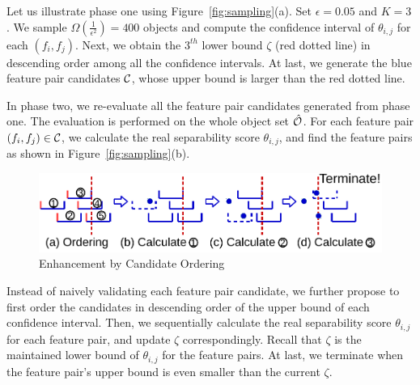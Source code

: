 \begin{example}
Let us illustrate phase one using Figure~\ref{fig:sampling}(a). Set $\epsilon = 0.05$ and $K=3$. We sample $\Omega(\frac{1}{\epsilon^2})=400$ objects and compute the confidence interval of $\theta_{i,j}$ for each $(f_i,f_j)$. Next, we obtain the $3^{th}$ lower bound $\zeta$ (red dotted line) in descending order among all the confidence intervals. At last, we generate the blue feature pair candidates $\cc$, whose upper bound is larger than the red dotted line.
\end{example}

In phase two, we re-evaluate all the feature pair candidates generated from phase one. The evaluation is performed on the whole object set $\hat{\oo}$. For each feature pair $(f_i,f_j)\in \cc$, we calculate the real separability score $\theta_{i,j}$, and find the \topk feature pairs as shown in Figure~\ref{fig:sampling}(b). 
\begin{figure}[h]
  \centering
  \vspace{-5mm}
  \includegraphics[width=\linewidth]{fig/candidate_ordering.pdf}
  \vspace{-6mm}
\caption{Enhancement by Candidate Ordering}
\vspace{-5mm}
\label{fig:candidate_ordering}
\end{figure} 

  Instead of naively validating each feature pair candidate, we further propose to first order the candidates in descending order of the upper bound of each confidence interval. Then, we sequentially calculate the real separability score $\theta_{i,j}$ for each feature pair, and update $\zeta$ correspondingly. Recall that $\zeta$ is the maintained lower bound of $\theta_{i,j}$ for the \topk feature pairs. At last, we terminate when the feature pair's upper bound is even smaller than the current $\zeta$.


